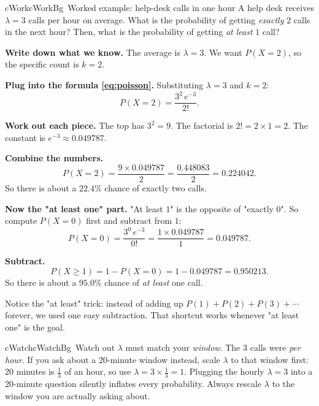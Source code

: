 \documentclass[a4paper,11pt]{article}
\newenvironment{workedbox}[1]{%
  \begin{calloutbox}{cWork}{cWorkBg}{\ding{46}\, Worked example: #1}}{\end{calloutbox}}
\newenvironment{watchoutbox}{%
  \begin{calloutbox}{cWatch}{cWatchBg}{\ding{55}\, Watch out}}{\end{calloutbox}}
\begin{document}
\begin{workedbox}{help-desk calls in one hour}
A help desk receives $\lambda = 3$ calls per hour on average. What is the
probability of getting \emph{exactly} $2$ calls in the next hour? Then, what is
the probability of getting \emph{at least} $1$ call?
\begin{steps}
  \item \textbf{Write down what we know.} The average is $\lambda = 3$. We want
        $P(X = 2)$, so the specific count is $k = 2$.
  \item \textbf{Plug into the formula \eqref{eq:poisson}.} Substituting
        $\lambda = 3$ and $k = 2$:
        \[
          P(X = 2) = \frac{3^{2}\, e^{-3}}{2!}.
        \]
  \item \textbf{Work out each piece.} The top has $3^{2} = 9$. The factorial is
        $2! = 2 \times 1 = 2$. The constant is $e^{-3} \approx 0.049787$.
  \item \textbf{Combine the numbers.}
        \[
          P(X = 2)
          = \frac{9 \times 0.049787}{2}
          = \frac{0.448083}{2}
          = 0.224042.
        \]
        So there is about a $\mathbf{22.4\%}$ chance of exactly two calls.
  \item \textbf{Now the "at least one" part.} "At least $1$" is the opposite of
        "exactly $0$". So compute $P(X = 0)$ first and subtract from $1$:
        \[
          P(X = 0) = \frac{3^{0}\, e^{-3}}{0!}
                   = \frac{1 \times 0.049787}{1}
                   = 0.049787.
        \]
  \item \textbf{Subtract.}
        \[
          P(X \ge 1) = 1 - P(X = 0)
                     = 1 - 0.049787
                     = 0.950213.
        \]
        So there is about a $\mathbf{95.0\%}$ chance of \emph{at least} one call.
\end{steps}
Notice the "at least" trick: instead of adding up $P(1) + P(2) + P(3) + \cdots$
forever, we used one easy subtraction. That shortcut works whenever "at least
one" is the goal.
\end{workedbox}

\begin{watchoutbox}
$\lambda$ must match your \emph{window}. The $3$ calls were \emph{per hour}. If
you ask about a $20$-minute window instead, scale $\lambda$ to that window
first: $20$ minutes is $\tfrac{1}{3}$ of an hour, so use $\lambda = 3 \times
\tfrac{1}{3} = 1$. Plugging the hourly $\lambda = 3$ into a $20$-minute question
silently inflates every probability. Always rescale $\lambda$ to the window you
are actually asking about.
\end{watchoutbox}
\end{document}
